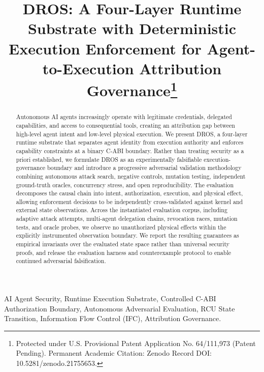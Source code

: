 \documentclass[conference]{IEEEtran}
\begin{document}
\title{DROS: A Four-Layer Runtime Substrate with Deterministic Execution Enforcement for Agent-to-Execution Attribution Governance\thanks{Protected under U.S. Provisional Patent Application No. 64/111,973 (Patent Pending). Permanent Academic Citation: Zenodo Record DOI: 10.5281/zenodo.21755653.}}

\author{
}

\maketitle
\thispagestyle{plain}
\pagestyle{plain}

\begin{abstract}
Autonomous AI agents increasingly operate with legitimate credentials, delegated capabilities, and access to consequential tools, creating an attribution gap between high-level agent intent and low-level physical execution. We present DROS, a four-layer runtime substrate that separates agent identity from execution authority and enforces capability constraints at a binary C-ABI boundary. Rather than treating security as a priori established, we formulate DROS as an experimentally falsifiable execution-governance boundary and introduce a progressive adversarial validation methodology combining autonomous attack search, negative controls, mutation testing, independent ground-truth oracles, concurrency stress, and open reproducibility. The evaluation decomposes the causal chain into intent, authorization, execution, and physical effect, allowing enforcement decisions to be independently cross-validated against kernel and external state observations. Across the instantiated evaluation corpus, including adaptive attack attempts, multi-agent delegation chains, revocation races, mutation tests, and oracle probes, we observe no unauthorized physical effects within the explicitly instrumented observation boundary. We report the resulting guarantees as empirical invariants over the evaluated state space rather than universal security proofs, and release the evaluation harness and counterexample protocol to enable continued adversarial falsification.
\end{abstract}

\begin{IEEEkeywords}
AI Agent Security, Runtime Execution Substrate, Controlled C-ABI Authorization Boundary, Autonomous Adversarial Evaluation, RCU State Transition, Information Flow Control (IFC), Attribution Governance.
\end{IEEEkeywords}
\end{document}
